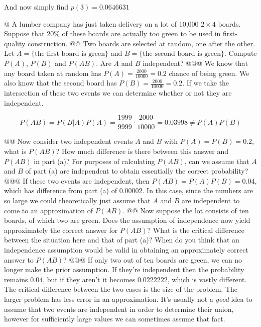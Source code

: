 \documentclass[10pt]{article}
\begin{document}
\begin{easylist}[enumerate]
    And now simply find $p(3) = \boxed{0.0646631}$

    @ A lumber company has just taken delivery on a lot of 10,000 $2 \times 4$ boards. Suppose that 20\% of these boards
    are actually too green to be used in first-quality construction.
    @@ Two boards are selected at random, one after the other. Let $A = \{\text{the first board is green}\}$ and $B =
    \{\text{the second board is green}\}$. Compute $P(A)$, $P(B)$ and $P(AB)$. Are $A$ and $B$ independent?
    @@@ We know that any board taken at random has $P(A) = \frac{2000}{10000} = 0.2$ chance of being green. We also know
    that the second board has $P(B) = \frac{2000}{10000} = 0.2$. If we take the intersection of these two events
    we can determine whether or not they are independent.

        \[ P(AB) = P(B|A)P(A) = \frac{1999}{9999} \cdot \frac{2000}{10000} = 0.03998 \neq P(A)P(B) \]

    @@ Now consider two independent events $A$ and $B$ with $P(A) = P(B) = 0.2$, what is $P(AB)$?  How much difference
    is there between this answer and $P(AB)$ in part (a)? For purposes of calculating $P(AB)$, can we assume that $A$
    and $B$ of part (a) are independent to obtain essentially the correct probability?
    @@@ If these two events are independent, then $P(AB) = P(A)P(B) = 0.04$, which has difference from part (a) of
    $0.00002$. In this case, since the numbers are so large we could theoretically just assume that $A$ and $B$ are
    independent to come to an approximation of $P(AB)$.
    @@ Now suppose the lot consists of ten boards, of which two are green. Does the assumption of independence now yield
    approximately the correct answer for $P(AB)$? What is the critical difference between the situation here and that of
    part (a)? When do you think that an independence assumption would be valid in obtaining an approximately correct
    answer to $P(AB)$?
    @@@ If only two out of ten boards are green, we can no longer make the prior assumption. If they're independent then
    the probability remains $0.04$, but if they aren't it becomes $0.0222222$, which is vastly different. The critical
    difference between the two cases is the size of the problem. The larger problem has less error in an approximation.
    It's usually not a \textit{good} idea to assume that two events are independent in order to determine their union,
    however for sufficiently large values we can sometimes assume that fact.

\end{easylist}
\end{document}
